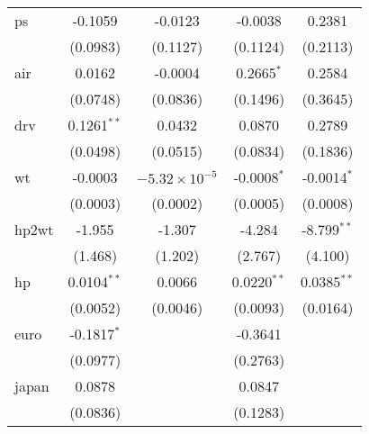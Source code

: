 \begin{tabular}{lcccc}
   ps                                         & -0.1059         & -0.0123                & -0.0038                & 0.2381\\   
                                              & (0.0983)        & (0.1127)               & (0.1124)               & (0.2113)\\   
   air                                        & 0.0162          & -0.0004                & 0.2665$^{*}$           & 0.2584\\   
                                              & (0.0748)        & (0.0836)               & (0.1496)               & (0.3645)\\   
   drv                                        & 0.1261$^{**}$   & 0.0432                 & 0.0870                 & 0.2789\\   
                                              & (0.0498)        & (0.0515)               & (0.0834)               & (0.1836)\\   
   wt                                         & -0.0003         & $-5.32\times 10^{-5}$  & -0.0008$^{*}$          & -0.0014$^{*}$\\   
                                              & (0.0003)        & (0.0002)               & (0.0005)               & (0.0008)\\   
   hp2wt                                      & -1.955          & -1.307                 & -4.284                 & -8.799$^{**}$\\   
                                              & (1.468)         & (1.202)                & (2.767)                & (4.100)\\   
   hp                                         & 0.0104$^{**}$   & 0.0066                 & 0.0220$^{**}$          & 0.0385$^{**}$\\   
                                              & (0.0052)        & (0.0046)               & (0.0093)               & (0.0164)\\   
   euro                                       & -0.1817$^{*}$   &                        & -0.3641                &   \\   
                                              & (0.0977)        &                        & (0.2763)               &   \\   
   japan                                      & 0.0878          &                        & 0.0847                 &   \\   
                                              & (0.0836)        &                        & (0.1283)               &   \\   

\end{tabular}
